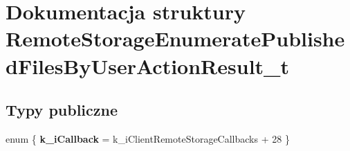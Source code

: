 \hypertarget{struct_remote_storage_enumerate_published_files_by_user_action_result__t}{}\section{Dokumentacja struktury Remote\+Storage\+Enumerate\+Published\+Files\+By\+User\+Action\+Result\+\_\+t}
\label{struct_remote_storage_enumerate_published_files_by_user_action_result__t}
\subsection*{Typy publiczne}
\begin{DoxyCompactItemize}
\item 
\mbox{\label{struct_remote_storage_enumerate_published_files_by_user_action_result__t_a55721ad6ef8b77095d816e2b5a102df0}} 
enum \{ {\bfseries k\+\_\+i\+Callback} = k\+\_\+i\+Client\+Remote\+Storage\+Callbacks + 28
 \}
\end{DoxyCompactItemize}
